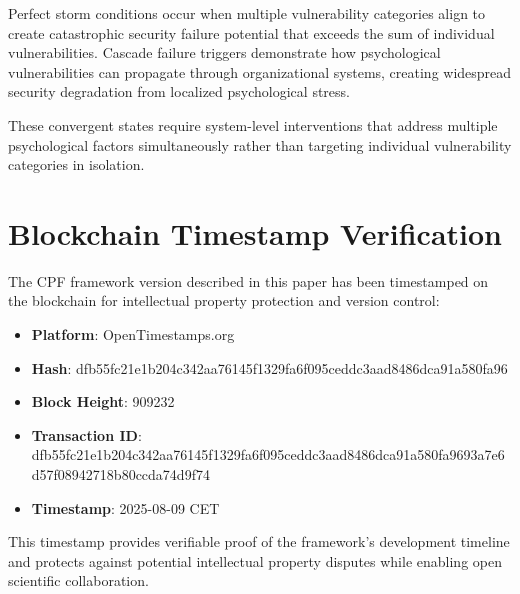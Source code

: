 \documentclass[11pt,a4paper]{article}
\begin{document}
Perfect storm conditions occur when multiple vulnerability categories align to create catastrophic security failure potential that exceeds the sum of individual vulnerabilities. Cascade failure triggers demonstrate how psychological vulnerabilities can propagate through organizational systems, creating widespread security degradation from localized psychological stress.

These convergent states require system-level interventions that address multiple psychological factors simultaneously rather than targeting individual vulnerability categories in isolation.

\section{Blockchain Timestamp Verification}
\label{app:blockchain}

The CPF framework version described in this paper has been timestamped on the blockchain for intellectual property protection and version control:

\begin{itemize}
\item \textbf{Platform}: OpenTimestamps.org
\item \textbf{Hash}: dfb55fc21e1b204c342aa76145f1329fa6f095ceddc3aad8486dca91a580fa96
\item \textbf{Block Height}: 909232
\item \textbf{Transaction ID}: dfb55fc21e1b204c342aa76145f1329fa6f095ceddc3aad8486dca91a580fa9693a7e6d57f08942718b80ccda74d9f74
\item \textbf{Timestamp}: 2025-08-09 CET
\end{itemize}

This timestamp provides verifiable proof of the framework's development timeline and protects against potential intellectual property disputes while enabling open scientific collaboration.
\end{document}
